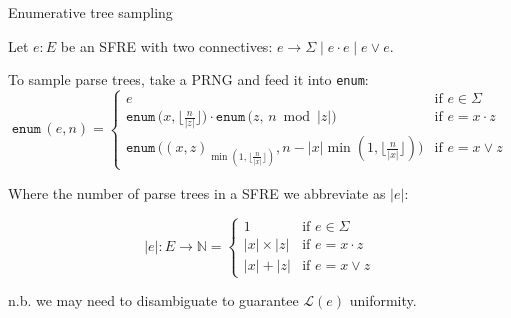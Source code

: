 \documentclass{beamer}
\begin{document}
\begin{frame}{Enumerative tree sampling}
  \vspace{-0.3cm}

  Let \( e: E \) be an SFRE with two connectives: $ e \rightarrow \Sigma \mid e \cdot e \mid e \lor e $.

  \begin{theorem}
    To sample parse trees, take a PRNG and feed it into \texttt{enum}:
    \begin{equation*}
      \texttt{enum}\,(e, n) = \begin{cases}
        e &\text{if } e \in \Sigma \\
        \texttt{enum}\,\big(x, \lfloor \frac{n}{|z|} \rfloor\big) \cdot \texttt{enum}\,\big(z,\, n \bmod |z|\big)  &\text{if } e = x \cdot z \\
        \texttt{enum}\,\big((x, z)_{\min(1, \lfloor\frac{n}{|x|}\rfloor)}, n-|x|\min(1, \lfloor\frac{n}{|x|}\rfloor)\big) &\text{if } e = x \vee z
      \end{cases}
    \end{equation*}

    Where the number of parse trees in a SFRE we abbreviate as $|e|$:

    \begin{equation*}
      |e|: E \rightarrow \mathbb{N} = \begin{cases}
        1           & \text{if } e \in \Sigma \\
        |x| \times |z|  & \text{if } e = x \cdot z \\
        |x| + |z|       & \text{if } e = x \vee z
      \end{cases}
    \end{equation*}

    n.b. we may need to disambiguate to guarantee $\mathcal{L}(e)$ uniformity.
  \end{theorem}
\end{frame}
\end{document}
